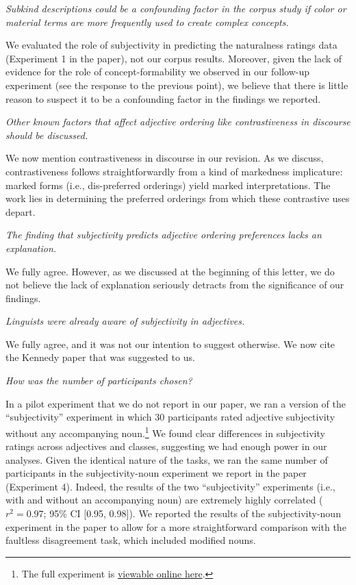 \documentclass[12pt]{article}
\begin{document}
\item  \emph{Subkind descriptions could be a confounding factor in the corpus study if color or material terms are more frequently used to create complex concepts.}

We evaluated the role of subjectivity in predicting the naturalness ratings data (Experiment 1 in the paper), not our corpus results. Moreover, given the lack of evidence for the role of concept-formability we observed in our follow-up experiment (see the response to the previous point), we believe that there is little reason to suspect it to be a confounding factor in the findings we reported. 



\item \emph{Other known factors that affect adjective ordering like contrastiveness in discourse should be discussed.}

We now mention contrastiveness in discourse in our revision. As we discuss, contrastiveness follows straightforwardly from a kind of markedness implicature: marked forms (i.e., dis-preferred orderings) yield marked interpretations. The work lies in determining the preferred orderings from which these contrastive uses depart.


\item \emph{The finding that subjectivity predicts adjective ordering preferences lacks an explanation.}

We fully agree. However, as we discussed at the beginning of this letter, we do not believe the lack of explanation seriously detracts from the significance of our findings.


\item \emph{Linguists were already aware of subjectivity in adjectives.}

We fully agree, and it was not our intention to suggest otherwise. We now cite the Kennedy paper that was suggested to us.


\item \emph{How was the number of participants chosen?}

In a pilot experiment that we do not report in our paper, we ran a version of the ``subjectivity'' experiment in which 30 participants rated adjective subjectivity without any accompanying noun.\footnote{The full experiment is \href{http://web.stanford.edu/~scontras/adjective_ordering/experiments/6-subjectivity/subjectivity.html}{viewable online here}.} We found clear differences in subjectivity ratings across adjectives and classes, suggesting we had enough power in our analyses. 
Given the identical nature of the tasks, we ran the same number of participants in the subjectivity-noun experiment we report in the paper (Experiment 4). Indeed, the results of the two ``subjectivity'' experiments (i.e., with and without an accompanying noun) are extremely highly correlated ($r^2=0.97$; 95\% CI [0.95,  0.98]). We reported the results of the subjectivity-noun experiment in the paper to allow for a more straightforward comparison with the faultless disagreement task, which included modified nouns.
\end{document}
